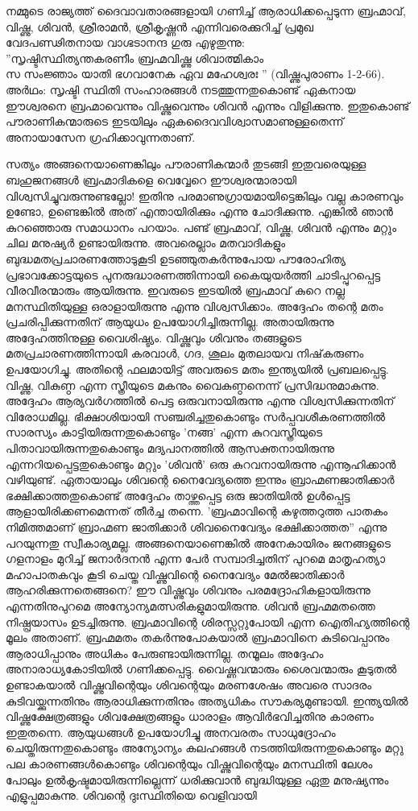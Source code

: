നമ്മുടെ രാജ്യത്ത് ദൈവാവതാരങ്ങളായി ഗണിച്ച് ആരാധിക്കപ്പെടുന്ന ബ്രഹ്മാവ്, വിഷ്ണു, ശിവന്‍, ശ്രീരാമന്‍, ശ്രീകൃഷ്ണന്‍ എന്നിവരെക്കുറിച്ച് പ്രമുഖ വേദപണ്ഢിതനായ വാഗ്ഭടാനന്ദ ഗുരു എഴുതുന്നു:\\
''സൃഷ്ടിസ്ഥിത്യന്തകരണീം ബ്രഹ്മവിഷ്ണു ശിവാത്മികാം\\
സ സംജ്ഞാം യാതി ഭഗവാനേക ഏവ മഹേശ്വരഃ '' (വിഷ്ണുപുരാണം 1-2-66).\\
അര്‍ഥം: സൃഷ്ടി സ്ഥിതി സംഹാരങ്ങള്‍ നടത്തുന്നതുകൊണ്ട് ഏകനായ ഈശ്വരനെ ബ്രഹ്മാവെന്നും വിഷ്ണുവെന്നും ശിവന്‍ എന്നും വിളിക്കുന്നു. ഇതുകൊണ്ട് പൗരാണികന്മാരുടെ ഇടയിലും ഏകദൈവവിശ്വാസമാണുള്ളതെന്ന് അനായാസേന ഗ്രഹിക്കാവുന്നതാണ്.

സത്യം അങ്ങനെയാണെങ്കിലും പൗരാണികന്മാര്‍ തുടങ്ങി ഇതുവരെയുള്ള ബഹുജനങ്ങള്‍ ബ്രഹ്മാദികളെ വെവ്വേറെ ഈശ്വരന്മാരായി വിശ്വസിച്ചുവരുന്നുണ്ടല്ലോ! ഇതിനു പരമാണുഗ്രായമായിട്ടെങ്കിലും വല്ല കാരണവും ഉണ്ടോ, ഉണ്ടെങ്കില്‍ അത് എന്തായിരിക്കും എന്നു ചോദിക്കുന്നു. എങ്കില്‍ ഞാന്‍ കുറഞ്ഞൊരു സമാധാനം പറയാം. പണ്ട് ബ്രഹ്മാവ്, വിഷ്ണു, ശിവന്‍ എന്നും മറ്റും ചില മനുഷ്യര്‍ ഉണ്ടായിരുന്നു. അവരെല്ലാം മതവാദികളും ബുദ്ധമതപ്രചാരണത്തോടുകൂടി ഉടഞ്ഞുതകര്‍ന്നുപോയ പൗരോഹിത്യ പ്രഭാവക്കോട്ടയുടെ പുനരുദ്ധാരണത്തിന്നായി കൈയുയര്‍ത്തി ചാടിപ്പുറപ്പെട്ട വീരവീരന്മാരും ആയിരുന്നു. ഇവരുടെ ഇടയില്‍ ബ്രഹ്മാവ് കുറെ നല്ല മനസ്ഥിതിയുള്ള ഒരാളായിരുന്നു എന്നു വിശ്വസിക്കാം. അദ്ദേഹം തന്റെ മതം പ്രചരിപ്പിക്കുന്നതിന് ആയുധം ഉപയോഗിച്ചിരുന്നില്ല. അതായിരുന്നു അദ്ദേഹത്തിനുള്ള വൈശിഷ്ട്യം. വിഷ്ണുവും ശിവനും തങ്ങളുടെ മതപ്രചാരണത്തിന്നായി കരവാള്‍, ഗദ, ശൂലം മുതലായവ നിഷ്‌കരുണം ഉപയോഗിച്ചു. അതിന്റെ ഫലമായിട്ട് അവരുടെ മതം ഇന്ത്യയില്‍ പ്രബലപ്പെട്ടു. വിഷ്ണു, വികുണ്ഠ എന്ന സ്ത്രീയുടെ മകനും വൈകുണ്ഠനെന്ന് പ്രസിദ്ധനുമാകുന്നു. അദ്ദേഹം ആര്യവര്‍ഗത്തില്‍ പെട്ട ഒരുവനായിരുന്നു എന്നു വിശ്വസിക്കുന്നതിന് വിരോധമില്ല. ഭിക്ഷാശിയായി സഞ്ചരിച്ചതുകൊണ്ടും സര്‍പ്പവശീകരണത്തില്‍ സാരസ്യം കാട്ടിയിരുന്നതുകൊണ്ടും 'നങ്ങ' എന്ന കുറവസ്ത്രീയുടെ പിതാവായിരുന്നതുകൊണ്ടും മദ്യപാനത്തില്‍ ആസക്തനായിരുന്നു എന്നറിയപ്പെട്ടതുകൊണ്ടും മറ്റും 'ശിവന്‍' ഒരു കുറവനായിരുന്നു എന്നൂഹിക്കാന്‍ വഴിയുണ്ട്. ഏതായാലും ശിവന്റെ നൈവേദ്യത്തെ ഇന്നും ബ്രാഹ്മണജാതിക്കാര്‍ ഭക്ഷിക്കാത്തതുകൊണ്ട് അദ്ദേഹം താഴ്ത്തപ്പെട്ട ഒരു ജാതിയില്‍ ഉള്‍പ്പെട്ട ആളായിരിക്കണമെന്നത് തീര്‍ച്ച തന്നെ. 'ബ്രഹ്മാവിന്റെ കഴുത്തറുത്ത പാതകം നിമിത്തമാണ് ബ്രാഹ്മണ ജാതിക്കാര്‍ ശിവനൈവേദ്യം ഭക്ഷിക്കാത്തത'' എന്നു പറയുന്നതു സ്വീകാര്യമല്ല. അങ്ങനെയാണെങ്കില്‍ അനേകായിരം ജനങ്ങളുടെ ഗളനാളം മുറിച്ച് ജനാര്‍ദനന്‍ എന്ന പേര്‍ സമ്പാദിച്ചതിന് പുറമെ മാതൃഹത്യാ മഹാപാതകവും കൂടി ചെയ്ത വിഷ്ണുവിന്റെ നൈവേദ്യം മേല്‍ജാതിക്കാര്‍ ആഹരിക്കുന്നതെങ്ങനെ? ഈ വിഷ്ണുവും ശിവനും പരമദ്രോഹികളായിരുന്നു എന്നതിനുപുറമെ അന്യോന്യമത്സരികളുമായിരുന്നു. ശിവന്‍ ബ്രഹ്മമതത്തെ നിഷ്പ്രയാസം ഉടച്ചിരുന്നു. ബ്രഹ്മാവിന്റെ ശിരസ്സറ്റുപോയി എന്ന ഐതിഹ്യത്തിന്റെ മൂലം അതാണ്. ബ്രഹ്മമതം തകര്‍ന്നുപോകയാല്‍ ബ്രഹ്മാവിനെ കുടിവെപ്പാനും ആരാധിപ്പാനും അധികം പേരുണ്ടായിരുന്നില്ല. തന്മൂലം അദ്ദേഹം അനാരാധ്യകോടിയില്‍ ഗണിക്കപ്പെട്ടു. വൈഷ്ണവന്മാരും ശൈവന്മാരും കൂടുതല്‍ ഉണ്ടാകയാല്‍ വിഷ്ണുവിന്റെയും ശിവന്റെയും മരണശേഷം അവരെ സാദരം കുടിവയ്ക്കുന്നതിനും ആരാധിക്കുന്നതിനും അത്യധികം സൗകര്യമുണ്ടായി. ഇന്ത്യയില്‍ വിഷ്ണുക്ഷേത്രങ്ങളും ശിവക്ഷേത്രങ്ങളും ധാരാളം ആവിര്‍ഭവിച്ചതിനു കാരണം ഇതുതന്നെ. ആയുധങ്ങള്‍ ഉപയോഗിച്ചു അനവരതം സാധുദ്രോഹം ചെയ്തിരുന്നതുകൊണ്ടും അന്യോന്യം കലഹങ്ങള്‍ നടത്തിയിരുന്നതുകൊണ്ടും മറ്റു പല കാരണങ്ങള്‍കൊണ്ടും ശിവന്റെയും വിഷ്ണുവിന്റെയും മനസ്ഥിതി ലേശം പോലും ഉല്‍കൃഷ്ടമായിരുന്നില്ലെന്ന് ധരിക്കുവാന്‍ ബുദ്ധിയുള്ള ഏതു മനുഷ്യന്നും എളുപ്പമാകുന്നു. ശിവന്റെ ദുഃസ്ഥിതിയെ വെളിവായി 